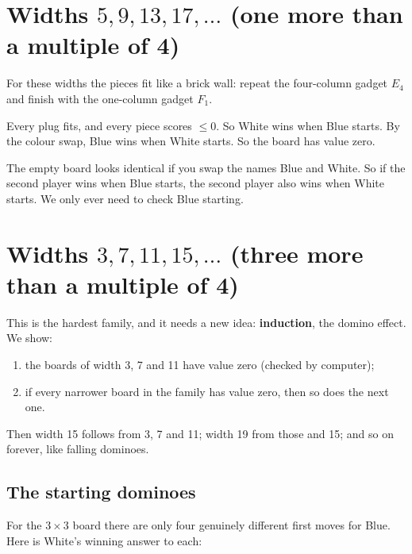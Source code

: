 \documentclass[11pt]{article}
\begin{document}
\section{Widths $5, 9, 13, 17,\dots$ (one more than a multiple of 4)}

For these widths the pieces fit like a brick wall: repeat the four-column
gadget $E_4$ and finish with the one-column gadget $F_1$.

\begin{center}
\end{center}

Every plug fits, and every piece scores $\le0$. So White wins when Blue starts.
By the colour swap, Blue wins when White starts. So the board has value zero.

\begin{idea}
The empty board looks identical if you swap the names Blue and White. So if
the second player wins when Blue starts, the second player also wins when
White starts. We only ever need to check Blue starting.
\end{idea}

\section{Widths $3, 7, 11, 15,\dots$ (three more than a multiple of 4)}

This is the hardest family, and it needs a new idea: \textbf{induction}, the
domino effect. We show:
\begin{enumerate}[nosep]
\item the boards of width 3, 7 and 11 have value zero (checked by computer);
\item if every narrower board in the family has value zero, then so does the
next one.
\end{enumerate}
Then width 15 follows from 3, 7 and 11; width 19 from those and 15; and so on
forever, like falling dominoes.

\begin{center}
\end{center}

\subsection{The starting dominoes}

For the $3\times 3$ board there are only four genuinely different first
moves for Blue. Here is White's winning answer to each:
\end{document}
